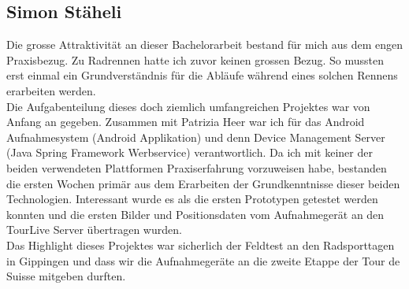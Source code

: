 \subsection{Simon Stäheli}
Die grosse Attraktivität an dieser Bachelorarbeit bestand für mich aus dem engen Praxisbezug. Zu Radrennen hatte ich zuvor keinen grossen Bezug. So mussten erst einmal ein Grundverständnis für die Abläufe während eines solchen Rennens erarbeiten werden. 
\\

Die Aufgabenteilung dieses doch ziemlich umfangreichen Projektes war von Anfang an gegeben. Zusammen mit Patrizia Heer war ich für das Android Aufnahmesystem (Android Applikation) und denn Device Management Server (Java Spring Framework Werbservice) verantwortlich. Da ich mit keiner der beiden verwendeten Plattformen Praxiserfahrung vorzuweisen habe, bestanden die ersten Wochen primär aus dem Erarbeiten der  Grundkenntnisse dieser beiden Technologien. Interessant wurde es als die ersten Prototypen getestet werden konnten und die ersten Bilder und Positionsdaten vom Aufnahmegerät an den TourLive Server übertragen wurden.
\\

Das Highlight dieses Projektes war sicherlich der Feldtest an den Radsporttagen in Gippingen und dass wir die Aufnahmegeräte an die zweite Etappe der Tour de Suisse mitgeben durften. 


